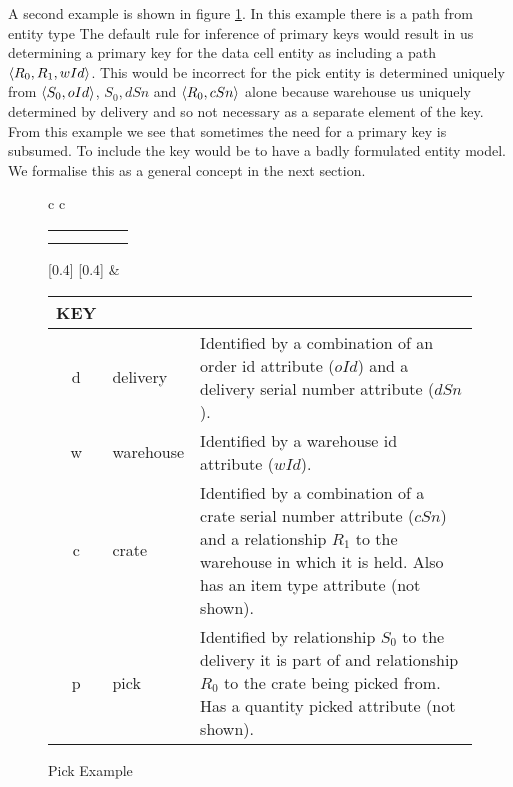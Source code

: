 \documentclass[10pt,a4paper]{article}
\begin{document}
A second example is shown in figure \ref{pickexample}. In this example there is a path 
from  entity type The default rule for inference of primary keys would result in us determining
a primary key for the data cell entity as including a path 
$\langle R_0,R_1,wId\rangle$. This would be incorrect for the pick entity 
is determined uniquely from 
$\langle S_0,oId\rangle$, $S_0,dSn$ and $\langle R_0,cSn\rangle$ alone because 
warehouse us uniquely determined by delivery and so not necessary as a separate 
element of the key. From this example we see that sometimes
the need for a primary key is subsumed. To include the key would be to 
have a badly formulated entity model. We formalise this as a general concept in the next section.
\begin{figure} [H]
\begin{center}
\begin{tabular}{c c}
\begin{tabular}{cp{0.75cm}cp{0.75cm}c}
   \Rnode{d}{d}    & & \Rnode{w}{w}   & & \Rnode{v}{v}\\[1.2cm]     
	 \Rnode{p}{p}  & & \Rnode{c}{c} & &               
\end{tabular}
[0.4]
\idcomp
{}
[0.4]
\idcomp
{} 
\idcomp
{} 
\idcomp
{}
\idcomp
{}
\idcomp
{}
\idcomp
& \footnotesize
\begin{tabular}{c p{1.5cm} p{4cm}}
KEY && \\
\hline
d & delivery & Identified by a combination of an order id attribute ($oId$) and a
delivery serial number  attribute ($dSn$). \\
w & warehouse & Identified by a warehouse id attribute ($wId$). \\
c & crate & Identified by a combination of a crate serial number attribute ($cSn$) and a relationship $R_1$ to the warehouse in which it is held.
             Also has an item type attribute (not shown).\\
p & pick & Identified by relationship $S_0$ to the delivery  it is part of and relationship $R_0$ to the crate being picked from. Has a quantity picked attribute (not shown). \\
\end{tabular} 
\end{tabular}
\end{center}
\caption{Pick Example}
\label{pickexample}
\end{figure}
\end{document}

